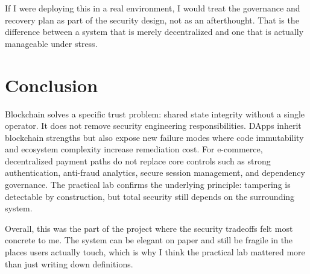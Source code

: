 \documentclass[10pt,a4paper]{article}
\begin{document}
If I were deploying this in a real environment, I would treat the governance and recovery plan as part of the security design, not as an afterthought. That is the difference between a system that is merely decentralized and one that is actually manageable under stress.

\section*{Conclusion}
Blockchain solves a specific trust problem: shared state integrity without a single operator. It does not remove security engineering responsibilities. DApps inherit blockchain strengths but also expose new failure modes where code immutability and ecosystem complexity increase remediation cost. For e-commerce, decentralized payment paths do not replace core controls such as strong authentication, anti-fraud analytics, secure session management, and dependency governance. The practical lab confirms the underlying principle: tampering is detectable by construction, but total security still depends on the surrounding system.

Overall, this was the part of the project where the security tradeoffs felt most concrete to me. The system can be elegant on paper and still be fragile in the places users actually touch, which is why I think the practical lab mattered more than just writing down definitions.
\end{document}
